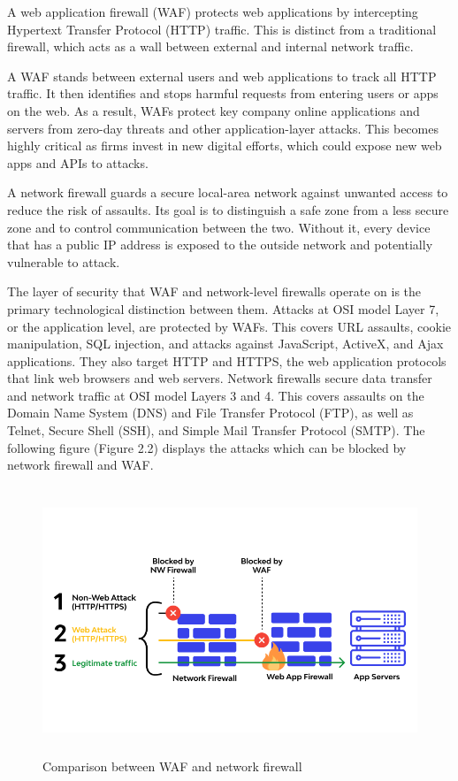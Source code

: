 A web application firewall (WAF) protects web applications by intercepting Hypertext Transfer Protocol (HTTP) traffic. This is distinct from a traditional firewall, which acts as a wall between external and internal network traffic.

A WAF stands between external users and web applications to track all HTTP traffic. It then identifies and stops harmful requests from entering users or apps on the web. As a result, WAFs protect key company online applications and servers from zero-day threats and other application-layer attacks. This becomes highly critical as firms invest in new digital efforts, which could expose new web apps and APIs to attacks.

A network firewall guards a secure local-area network against unwanted access to reduce the risk of assaults. Its goal is to distinguish a safe zone from a less secure zone and to control communication between the two. Without it, every device that has a public IP address is exposed to the outside network and potentially vulnerable to attack.

The layer of security that WAF and network-level firewalls operate on is the primary technological distinction between them. Attacks at OSI model Layer 7, or the application level, are protected by WAFs. This covers URL assaults, cookie manipulation, SQL injection, and attacks against JavaScript, ActiveX, and Ajax applications. They also target HTTP and HTTPS, the web application protocols that link web browsers and web servers. Network firewalls secure data transfer and network traffic at OSI model Layers 3 and 4. This covers assaults on the Domain Name System (DNS) and File Transfer Protocol (FTP), as well as Telnet, Secure Shell (SSH), and Simple Mail Transfer Protocol (SMTP). The following figure (Figure 2.2) displays the attacks which can be blocked by network firewall and WAF.
\begin{figure}[h!]
	\centering
	\includegraphics[width=\linewidth, height=8cm,keepaspectratio]{figures/waf3.png}
	\caption{Comparison between WAF and network firewall}
\end{figure}
\newpage

